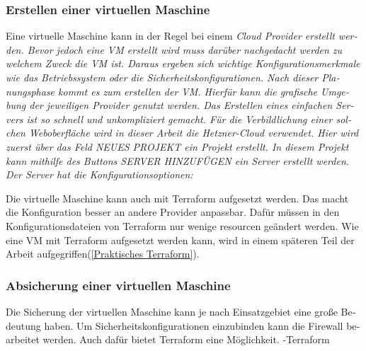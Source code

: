 \begin{otherlanguage}{ngerman}
\subsubsection{Erstellen einer virtuellen Maschine}
Eine virtuelle Maschine kann in der Regel bei einem \it Cloud Provider \rm erstellt werden.  Bevor jedoch eine VM erstellt wird muss darüber nachgedacht werden zu welchem Zweck die VM ist. Daraus ergeben sich wichtige Konfigurationsmerkmale wie das Betriebssystem oder die Sicherheitskonfigurationen. Nach dieser Planungsphase kommt es zum erstellen der VM. Hierfür kann die grafische Umgebung der jeweiligen Provider genutzt werden. Das Erstellen eines einfachen Servers ist so schnell und unkompliziert gemacht. Für die Verbildlichung einer solchen Weboberfläche wird in dieser Arbeit die \it Hetzner-Cloud \rm verwendet. Hier wird zuerst über das Feld \dq NEUES PROJEKT\dq{} ein Projekt erstellt. In diesem Projekt kann mithilfe des Buttons \dq SERVER HINZUFÜGEN\dq{} ein Server erstellt werden. Der Server hat die Konfigurationsoptionen:
\begin{acronym}
\end{acronym}
\newline
\newline
Die virtuelle Maschine kann auch mit Terraform aufgesetzt werden. Das macht die Konfiguration besser an andere Provider anpassbar. Dafür müssen in den Konfigurationsdateien von Terraform nur wenige resourcen geändert werden. Wie eine VM mit Terraform aufgesetzt werden kann, wird in einem späteren Teil der Arbeit aufgegriffen(\ref{Praktisches Terraform}).

\subsubsection{Absicherung einer virtuellen Maschine}
Die Sicherung der virtuellen Maschine kann je nach Einsatzgebiet eine große Bedeutung haben. Um Sicherheitskonfigurationen einzubinden kann die Firewall bearbeitet werden. Auch dafür bietet Terraform eine Möglichkeit. 
\newline 
-Terraform
\end{otherlanguage}